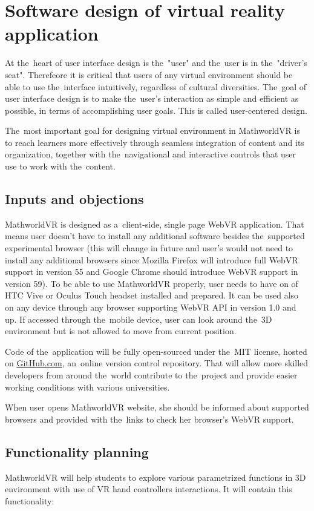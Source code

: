\section{Software design of virtual reality application}
At the~heart of user interface design is the~"user" and the~user is in the~"driver's seat". Therefeore it is critical that users of any virtual environment should be able to use the~interface intuitively, regardless of cultural diversities. The~goal of user interface design is to make the~user's interaction as simple and efficient as possible, in terms of accomplishing user goals. This is called user-centered design. \cite{badrul}

The~most important goal for designing virtual environment in MathworldVR is to reach learners more effectively through seamless integration of content and its organization, together with the~navigational and interactive controls that user use to work with the~content.


\subsection{Inputs and objections}
MathworldVR is designed as a~client-side, single page WebVR application. That means user doesn't have to install any additional software besides the~supported experimental browser (this will change in future and user's would not need to install any additional browsers since Mozilla Firefox will introduce full WebVR support in version 55 and Google Chrome should introduce WebVR support in version 59). To be able to use MathworldVR properly, user needs to have on of HTC Vive or Oculus Touch headset installed and prepared. It can be used also on any device through any browser supporting WebVR API in version 1.0 and up. If accessed through the~mobile device, user can look around the~3D environment but is not allowed to move from current position.

Code of the~application will be fully open-sourced under the~MIT license, hosted on \url{GitHub.com}, an~online version control repository. That will allow more skilled developers from around the~world contribute to the~project and provide easier working conditions with various universities.

When user opens MathworldVR website, she should be informed about supported browsers and provided with the~links to check her browser's WebVR support.

\subsection{Functionality planning}
MathworldVR will help students to explore various parametrized functions in 3D environment with use of VR hand controllers interactions. It will contain this functionality:

